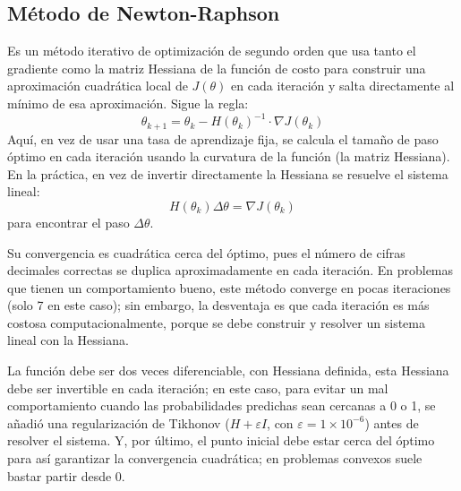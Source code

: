 \subsection{Método de Newton-Raphson}
Es un método iterativo de optimización de segundo orden que usa tanto el gradiente como la matriz Hessiana de la función de costo para construir una aproximación cuadrática local de $J(\theta)$ en cada iteración y salta directamente al mínimo de esa aproximación. Sigue la regla:
\begin{equation}
\theta_{k+1} = \theta_k - H(\theta_k)^{-1} \cdot \nabla J(\theta_k)
\end{equation}
Aquí, en vez de usar una tasa de aprendizaje fija, se calcula el tamaño de paso óptimo en cada iteración usando la curvatura de la función (la matriz Hessiana). En la práctica, en vez de invertir directamente la Hessiana se resuelve el sistema lineal:
\begin{equation}
H(\theta_k)\Delta\theta = \nabla J(\theta_k)
\end{equation}
para encontrar el paso $\Delta\theta$.

Su convergencia es cuadrática cerca del óptimo, pues el número de cifras decimales correctas se duplica aproximadamente en cada iteración. En problemas que tienen un comportamiento bueno, este método converge en pocas iteraciones (solo 7 en este caso); sin embargo, la desventaja es que cada iteración es más costosa computacionalmente, porque se debe construir y resolver un sistema lineal con la Hessiana.

La función debe ser dos veces diferenciable, con Hessiana definida, esta Hessiana debe ser invertible en cada iteración; en este caso, para evitar un mal comportamiento cuando las probabilidades predichas sean cercanas a 0 o 1, se añadió una regularización de Tikhonov ($H + \varepsilon I$, con $\varepsilon = 1 \times 10^{-6}$) antes de resolver el sistema. Y, por último, el punto inicial debe estar cerca del óptimo para así garantizar la convergencia cuadrática; en problemas convexos suele bastar partir desde 0.

